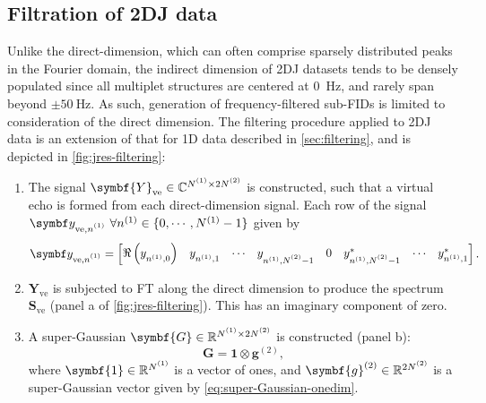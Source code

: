 \subsection{Filtration of \ac{2DJ} data}
\label{subsec:jres-filtering}
Unlike the direct-dimension, which can often comprise sparsely distributed
peaks in the Fourier domain, the indirect dimension of \ac{2DJ} datasets tends
to be densely populated since all multiplet structures are centered at
\qty{0}{\hertz}, and rarely span beyond $\pm \qty{50}{\hertz}$. As such,
generation of frequency-filtered sub-\acp{FID} is limited to consideration of
the direct dimension.
The filtering procedure applied to \ac{2DJ} data is an extension of that
for \ac{1D} data described in \cref{sec:filtering}, and is
depicted in \cref{fig:jres-filtering}:
\begin{enumerate}
    \item The signal $\symbf{Y}_{\text{ve}} \in \mathbb{C}^{\None \times 2 \Ntwo}$ is
    constructed, such that a virtual echo is formed from each direct-dimension
    signal. Each row of the signal $\by_{\text{ve},\none}\ \forall n^{(1)} \in
    \lbrace 0, \cdots, N^{(1)} - 1 \rbrace$ given by
    \begin{equation}
        \by_{\text{ve},\none} =
            \begin{bmatrix}
                \Re\left(y_{n^{(1)}, 0}^{\vphantom{*}}\right) &
                y_{n^{(1)}, 1}^{\vphantom{*}} &
                \cdots &
                y_{n^{(1)}, \Ntwo - 1}^{\vphantom{*}} &
                0 &
                y_{n^{(1)}, \Ntwo - 1}^* &
                \cdots &
                y_{n^{(1)}, 1}^*
            \end{bmatrix}.
    \end{equation}
    \item $\symbf{Y}_{\text{ve}}$ is subjected to \ac{FT} along the direct
        dimension to produce the spectrum  $\symbf{S}_{\text{ve}}$ (panel a of
        \cref{fig:jres-filtering}). This has an imaginary component of
        zero.
    \item A super-Gaussian $\symbf{G} \in \mathbb{R}^{\None \times 2 \Ntwo}$ is
        constructed (panel b):
        \begin{equation}
            \symbf{G} = \symbf{1} \otimes \symbf{g}^{(2)},
        \end{equation}
        where $\symbf{1} \in \mathbb{R}^{\None}$ is a vector of ones, and
        $\symbf{g}^{(2)} \in \mathbb{R}^{2\Ntwo}$ is a super-Gaussian vector
        given by \cref{eq:super-Gaussian-onedim}.

\end{enumerate}
